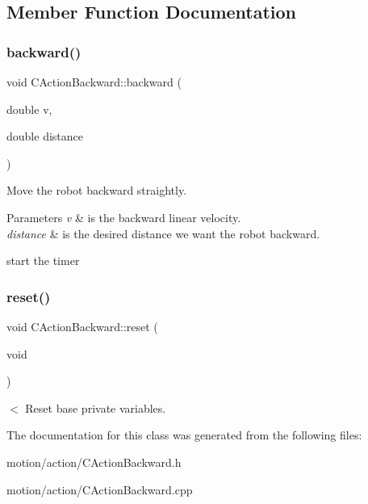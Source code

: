 \subsection{Member Function Documentation}
\mbox{\label{classmotion_1_1CActionBackward_ab05c93abef4815a4a9f38afeddbb8c2a}} 
\subsubsection{\texorpdfstring{backward()}{backward()}}
{\footnotesize\ttfamily void C\+Action\+Backward\+::backward (\begin{DoxyParamCaption}\item[{double}]{v,  }\item[{double}]{distance }\end{DoxyParamCaption})}

Move the robot backward straightly. 
\begin{DoxyParams}{Parameters}
{\em v} & is the backward linear velocity. \\
\hline
{\em distance} & is the desired distance we want the robot backward. \\
\hline
\end{DoxyParams}
start the timer \mbox{\label{classmotion_1_1CActionBackward_a609f364c24b4ceebda81c0b591692d2a}} 
\subsubsection{\texorpdfstring{reset()}{reset()}}
{\footnotesize\ttfamily void C\+Action\+Backward\+::reset (\begin{DoxyParamCaption}\item[{void}]{ }\end{DoxyParamCaption})}

$<$ Reset base private variables. 

The documentation for this class was generated from the following files\+:\begin{DoxyCompactItemize}
\item 
motion/action/C\+Action\+Backward.\+h\item 
motion/action/C\+Action\+Backward.\+cpp\end{DoxyCompactItemize}

